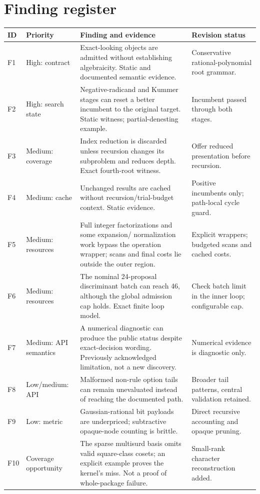\documentclass[11pt,a4paper]{article}
\newcommand{\code}[1]{\texttt{\detokenize{#1}}}
\theoremstyle{definition}\newtheorem{definition}[proposition]{Definition}
\theoremstyle{remark}\newtheorem{remark}[proposition]{Remark}
\begin{document}
\section{Finding register}
\small
\begin{longtable}{@{}P{.06\textwidth}P{.16\textwidth}P{.47\textwidth}P{.22\textwidth}@{}}
\toprule
ID & Priority & Finding and evidence & Revision status\\\midrule\endhead
F1 & High: contract & Exact-looking \code{Root} objects are admitted without
establishing algebraicity. Static and documented semantic evidence. & Conservative
rational-polynomial root grammar.\\
F2 & High: search state & Negative-radicand and Kummer stages can reset a better
incumbent to the original target. Static witness; partial-denesting example. &
Incumbent passed through both stages.\\
F3 & Medium: coverage & Index reduction is discarded unless recursion changes
its subproblem and reduces depth. Exact fourth-root witness. & Offer reduced
presentation before recursion.\\
F4 & Medium: cache & Unchanged results are cached without recursion/trial-budget
context. Static evidence. & Positive incumbents only; path-local cycle guard.\\
F5 & Medium: resources & Full integer factorizations and some expansion/
normalization work bypass the operation wrapper; scans and final costs lie
outside the outer region. & Explicit wrappers; budgeted scans and cached costs.\\
F6 & Medium: resources & The nominal 24-proposal discriminant batch can reach
46, although the global admission cap holds. Exact finite loop model. & Check
batch limit in the inner loop; configurable cap.\\
F7 & Medium: API semantics & A numerical diagnostic can produce the public
status \code{"Different"} despite exact-decision wording. Previously acknowledged
limitation, not a new discovery. & Numerical evidence is diagnostic only.\\
F8 & Low/medium: API & Malformed non-rule option tails can remain unevaluated
instead of reaching the documented \code{Failure} path. & Broader tail patterns,
central validation retained.\\
F9 & Low: metric & Gaussian-rational bit payloads are underpriced; subtractive
opaque-node counting is brittle. & Direct recursive accounting and opaque pruning.\\
F10 & Coverage opportunity & The sparse multisurd basis omits valid square-class
cosets; an explicit example proves the kernel's miss. Not a proof of whole-package
failure. & Small-rank character reconstruction added.\\\bottomrule
\end{longtable}
\normalsize
\end{document}
